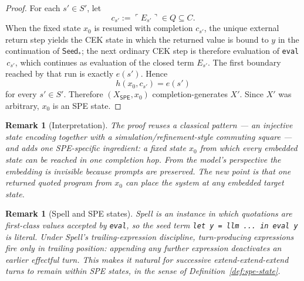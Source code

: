 \documentclass[11pt]{article}
\newtheorem{remark}[definition]{Remark}
\newcommand{\SPE}{\mathsf{SPE}}
\begin{document}
\begin{proof}
For each $s'\in S'$, let
\[
c_{s'}:=\ulcorner E_{s'}\urcorner\in Q\subseteq C.
\]
When the fixed state $x_0$ is resumed with completion $c_{s'}$, the unique external return step yields the CEK state in which the returned value is bound to $y$ in the continuation of $\mathsf{Seed}_{\ast}$; the next ordinary CEK step is therefore evaluation of \texttt{eval} $\,c_{s'}$, which continues as evaluation of the closed term $E_{s'}$. The first boundary reached by that run is exactly $e(s')$. Hence
\[
h(x_0,c_{s'})=e(s')
\]
for every $s'\in S'$. Therefore $(X_{\SPE},x_0)$ completion-generates $X'$. Since $X'$ was arbitrary, $x_0$ is an SPE state.
\end{proof}

\begin{remark}[Interpretation]\label{rem:interpretation}
The proof reuses a classical pattern --- an injective state encoding together with a simulation/refinement-style commuting square \cite{AbadiLamport91,LynchVaandrager95,SegalaLynch95} --- and adds one SPE-specific ingredient: a fixed state $x_0$ from which every embedded state can be reached in one completion hop. From the model's perspective the embedding is invisible because prompts are preserved. The new point is that one returned quoted program from $x_0$ can place the system at any embedded target state.
\end{remark}

\begin{remark}[Spell and SPE states]\label{rem:spell}
Spell is an instance in which quotations are first-class values accepted by \texttt{eval}, so the seed term \texttt{let y = llm ... in eval y} is literal. Under Spell's trailing-expression discipline, turn-producing expressions fire only in trailing position: appending any further expression deactivates an earlier effectful turn. This makes it natural for successive extend-extend-extend turns to remain within SPE states, in the sense of Definition~\ref{def:spe-state}.
\end{remark}
\end{document}
